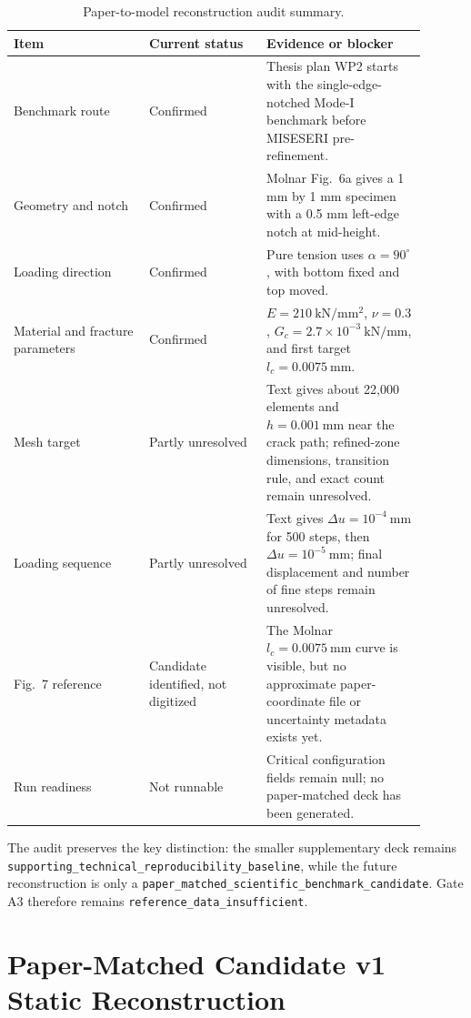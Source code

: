 \documentclass[11pt,a4paper]{article}
\begin{document}
\begin{table}[H]
\centering
\caption{Paper-to-model reconstruction audit summary.}
\begin{tabular}{p{0.30\linewidth} p{0.26\linewidth} p{0.34\linewidth}}
\toprule
Item & Current status & Evidence or blocker \\
\midrule
Benchmark route & Confirmed & Thesis plan WP2 starts with the single-edge-notched Mode-I benchmark before MISESERI pre-refinement. \\
Geometry and notch & Confirmed & Molnar Fig.~6a gives a 1 mm by 1 mm specimen with a 0.5 mm left-edge notch at mid-height. \\
Loading direction & Confirmed & Pure tension uses \(\alpha=90^\circ\), with bottom fixed and top moved. \\
Material and fracture parameters & Confirmed & \(E=210\ \mathrm{kN/mm^2}\), \(\nu=0.3\), \(G_c=2.7\times10^{-3}\ \mathrm{kN/mm}\), and first target \(l_c=0.0075\ \mathrm{mm}\). \\
Mesh target & Partly unresolved & Text gives about 22,000 elements and \(h=0.001\ \mathrm{mm}\) near the crack path; refined-zone dimensions, transition rule, and exact count remain unresolved. \\
Loading sequence & Partly unresolved & Text gives \(\Delta u=10^{-4}\ \mathrm{mm}\) for 500 steps, then \(\Delta u=10^{-5}\ \mathrm{mm}\); final displacement and number of fine steps remain unresolved. \\
Fig.~7 reference & Candidate identified, not digitized & The Molnar \(l_c=0.0075\ \mathrm{mm}\) curve is visible, but no approximate paper-coordinate file or uncertainty metadata exists yet. \\
Run readiness & Not runnable & Critical configuration fields remain null; no paper-matched deck has been generated. \\
\bottomrule
\end{tabular}
\end{table}

The audit preserves the key distinction: the smaller supplementary deck remains \texttt{supporting\_technical\_reproducibility\_baseline}, while the future reconstruction is only a \texttt{paper\_matched\_scientific\_benchmark\_candidate}. Gate A3 therefore remains \texttt{reference\_data\_insufficient}.

\section{Paper-Matched Candidate v1 Static Reconstruction}
\end{document}

